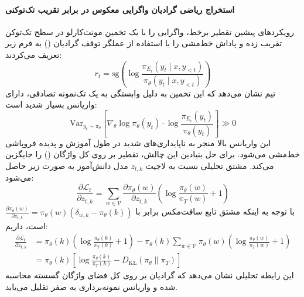 \paragraph*{استخراج ریاضی گرادیان واگرایی معکوس  در برابر تقریب تک‌توکنی}
رویکردهای پیشین تقطیر برخط، واگرایی  را با یک تخمین مونت‌کارلو در سطح تک‌توکن تقریب زده و پاداش خط‌مشی را با استفاده از عملگر توقف گرادیان () به فرم زیر تعریف می‌کردند:
\begin{equation}
    r_t = \mathrm{sg}\left( \log \frac{\pi_{E_i}(y_t \mid x, y_{<t})}{\pi_\theta(y_t \mid x, y_{<t})} \right)
\end{equation}
تیم  نشان می‌دهد که این تخمین به دلیل وابستگی به یک تک‌نمونه تصادفی، دارای واریانس بسیار شدید است:
\begin{equation}
    \mathrm{Var}_{y_t \sim \pi_\theta}\left[ \nabla_\theta \log \pi_\theta(y_t) \cdot \log \frac{\pi_{E_i}(y_t)}{\pi_\theta(y_t)} \right] \gg 0
\end{equation}
این واریانس بالا منجر به ناپایداری‌های شدید در طول آموزش و پدیده فروپاشی خط‌مشی می‌شود. برای حل بنیادین این چالش،  تقطیر بر روی کل واژگان () را جایگزین می‌کند. مشتق تحلیلی نسبت به لاجیت $z_{t, k}$ مدل دانش‌آموز به صورت زیر حاصل می‌شود:
\begin{equation}
    \frac{\partial \mathcal{L}_t}{\partial z_{t, k}} = \sum_{w \in \mathcal{V}} \frac{\partial \pi_\theta(w)}{\partial z_{t, k}} \left( \log \frac{\pi_\theta(w)}{\pi_T(w)} + 1 \right)
\end{equation}
با توجه به اینکه مشتق تابع سافت‌مکس برابر با $\frac{\partial \pi_\theta(w)}{\partial z_{t, k}} = \pi_\theta(w)(\delta_{w, k} - \pi_\theta(k))$ است، داریم:
\begin{equation}
    \begin{aligned}
        \frac{\partial \mathcal{L}_t}{\partial z_{t, k}} &= \pi_\theta(k) \left( \log \frac{\pi_\theta(k)}{\pi_T(k)} + 1 \right) - \pi_\theta(k) \sum_{w \in \mathcal{V}} \pi_\theta(w) \left( \log \frac{\pi_\theta(w)}{\pi_T(w)} + 1 \right) \\
        &= \pi_\theta(k) \left[ \log \frac{\pi_\theta(k)}{\pi_T(k)} - D_{\mathrm{KL}}(\pi_\theta \parallel \pi_T) \right]
    \end{aligned}
\end{equation}
این رابطه تحلیلی نشان می‌دهد که گرادیان بر روی کل فضای واژگان گسسته محاسبه شده و واریانس نمونه‌برداری به صفر تقلیل می‌یابد.

